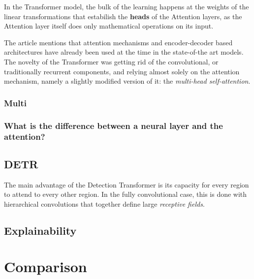 In the Transformer model, the bulk of the learning happens at the weights of the linear transformations that estabilish the \textbf{heads} of the Attention layers, as the Attention layer itself does only mathematical operations on its input. 

The article mentions that attention mechanisms and encoder-decoder based architectures have already been used at the time in the state-of-the art models. The novelty of the Transformer was getting rid of the convolutional, or traditionally recurrent components, and relying almost solely on the attention mechanism, namely a slightly modified version of it: the \textit{multi-head self-attention}.

\subsubsection{Multi }

\subsubsection{What is the difference between a neural layer and the attention?}

\subsection{DETR}

The main advantage of the Detection Transformer is its capacity for every region to attend to every other region. In the fully convolutional case, this is done with hierarchical convolutions that together define large \textit{receptive fields}.

\subsection{Explainability}

\section{Comparison}